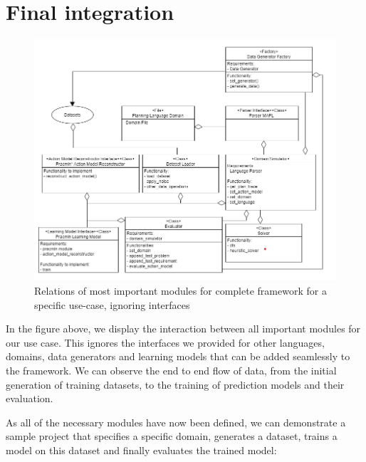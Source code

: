 \newpage
\section{Final integration}
\begin{figure}[h]
 \centering
 \includegraphics[width=1\textwidth]{images/architecture/final_integration_uml}
 \caption{Relations of most important modules for complete framework for a specific use-case, ignoring interfaces}
  \label{fig:learning-module-interaction-uml}
\end{figure}
In the figure above, we display the interaction between all important modules for our use case. This ignores the interfaces we provided for other languages, domains, data generators and learning models that can be added seamlessly to the framework. We can observe the end to end flow of data, from the initial generation of training datasets, to the training of prediction models and their evaluation.


As all of the necessary modules have now been defined, we can demonstrate a sample project that specifies a specific domain, generates a dataset, trains a model on this dataset and finally evaluates the trained model:

